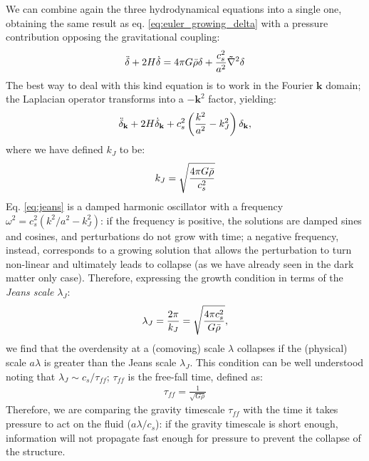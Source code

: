  We can combine again the three hydrodynamical equations into a single one, obtaining the same result as eq. \ref{eq:euler_growing_delta} with a pressure contribution opposing the gravitational coupling:
  \begin{align}
    \Ddot{\delta} + 2H\Dot{\delta} = 4\pi G \Bar{\rho}\delta + \frac{c_s^2}{a^2} \mathbf{\nabla}^2 \delta 
 \end{align}
 The best way to deal with this kind equation is to work in the Fourier $\mathbf{k}$ domain; the Laplacian operator transforms into a $-\mathbf{k}^2$ factor, yielding:
 \begin{align}
    \Ddot{\delta}_\mathbf{k} + 2H\Dot{\delta}_\mathbf{k} + c_s^2\left( \frac{k^2}{a^2}-k_J^2\right)\delta_\mathbf{k},
    \label{eq:jeans}
 \end{align}
 where we have defined $k_J$ to be:
  \begin{align}
   k_J = \sqrt{\frac{4\pi G\Bar{\rho}}{c_s^2}}
 \end{align}
 Eq. \ref{eq:jeans} is a damped harmonic oscillator with a frequency $\omega^2=c_s^2\left( k^2/a^2-k_J^2\right)$: if the frequency is positive, the solutions are damped sines and cosines, and perturbations do not grow with time; a negative frequency, instead, corresponds to a growing solution that allows the perturbation to turn non-linear and ultimately leads to collapse (as we have already seen in the dark matter only case).
 Therefore, expressing the growth condition in terms of the \textit{Jeans scale} $\lambda_J$:
 \begin{align}
   \lambda_J = \frac{2\pi}{k_J} = \sqrt{\frac{4\pi c_s^2}{G\Bar{\rho}}}, \label{eq:jeans_scale}
 \end{align}
 we find that the overdensity at a (comoving) scale $\lambda$ collapses if the (physical) scale $a\lambda$ is greater than the Jeans scale $\lambda_J$. This condition can be well understood noting that $\lambda_J \sim c_s/\tau_{ff}$; $\tau_{ff}$ is the free-fall time, defined as:
 \begin{align}
\tau_{ff} = \frac{1}{\sqrt{G\rho}} \label{eq:free_fall}
 \end{align}
 Therefore, we are comparing the gravity timescale $\tau_{ff}$ with the time it takes pressure to act on the fluid ($a\lambda/c_s$): if the gravity timescale is short enough, information will not propagate fast enough for pressure to prevent the collapse of the structure. 
 
